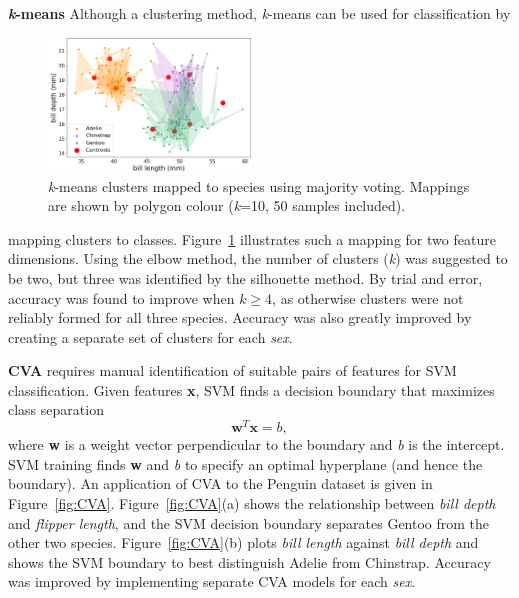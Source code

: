 \documentclass[a4paper, 11pt]{article}
\begin{document}
\textbf{\textit{k}-means} Although a clustering method, 
\textit{k}-means can be used for classification by 
\begin{figure} %
  \centering
  \vspace{-0.8\baselineskip} %
  \includegraphics[width=0.48\textwidth]{kmeansmap.png} %
  \vspace{-0.5\baselineskip} %
  \caption{\centering\linespread{0.8}\selectfont \textit{k}-means clusters mapped to species using majority voting. 
  Mappings are shown by polygon colour (\textit{k}=10, 50 samples included).}
  \vspace{-1\baselineskip} %
  \label{fig:kmeansmap}
\end{figure}
mapping clusters to classes. 
Figure~\ref{fig:kmeansmap} illustrates such a mapping for two feature dimensions.
Using the elbow method, the number of clusters (\textit{k}) was suggested to be two, but three was identified 
by the silhouette method. By trial and error, accuracy was found to improve when \(k \geq 4\),
as otherwise clusters were not reliably formed for all three species.   
Accuracy was also greatly improved by creating a separate set of clusters for each \textit{sex}.

\textbf{CVA}  
requires manual identification of suitable pairs of features for SVM classification. 
Given features \textbf{x}, SVM finds a decision boundary that maximizes class separation
\vspace{-0.8\baselineskip} %
\begin{equation}
\mathbf{w}^T \mathbf{x} = b ,
\end{equation}
where \textbf{w} is a weight vector perpendicular to the boundary and \textit{b} is the intercept. 
SVM training finds \textbf{w} and \textit{b} to specify an optimal hyperplane (and hence the boundary). 
An application of CVA to the Penguin dataset is given in Figure~\ref{fig:CVA}. 
Figure~\ref{fig:CVA}(a) shows the relationship between \textit{bill depth} and \textit{flipper length}, and
the SVM decision boundary separates Gentoo from the other two species. 
Figure~\ref{fig:CVA}(b) plots \textit{bill length} against \textit{bill depth} and shows the SVM boundary to best
distinguish Adelie from Chinstrap. Accuracy was improved by implementing separate CVA models for each \textit{sex}.
\end{document}
